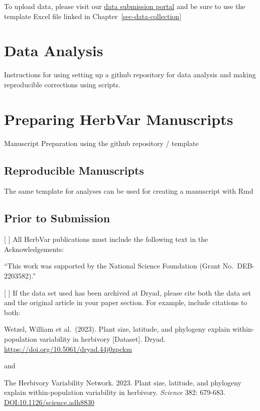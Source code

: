 \documentclass[
  letterpaper,
  DIV=11,
  numbers=noendperiod]{scrreprt}
\begin{document}
To upload data, please visit our
\href{https://herbvar.shinyapps.io/data_portal_actual/}{data submission
portal} and be sure to use the template Excel file linked in
Chapter~\ref{sec-data-collection}

\chapter{Data Analysis}\label{sec-data-analysis}

Instructions for using setting up a github repository for data analysis
and making reproducible corrections using scripts.

\chapter{Preparing HerbVar
Manuscripts}\label{preparing-herbvar-manuscripts}

Manuscript Preparation using the github repository / template

\section{Reproducible Manuscripts}\label{reproducible-manuscripts}

The same template for analyses can be used for creating a manuscript
with Rmd

\section{Prior to Submission}\label{prior-to-submission}

{[} {]} All HerbVar publications must include the following text in the
Acknowledgements:

``This work was supported by the National Science Foundation (Grant
No.~DEB-2203582).''

{[} {]} If the data set used has been archived at Dryad, please cite
both the data set and the original article in your paper section. For
example, include citations to both:

Wetzel, William et al.~(2023). Plant size, latitude, and phylogeny
explain within-population variability in herbivory {[}Dataset{]}. Dryad.
\url{https://doi.org/10.5061/dryad.44j0zpckm}

and

The Herbivory Variability Network. 2023. Plant size, latitude, and
phylogeny explain within-population variability in herbivory.
\emph{Science} 382: 679-683. \url{DOI:10.1126/science.adh8830}
\end{document}
